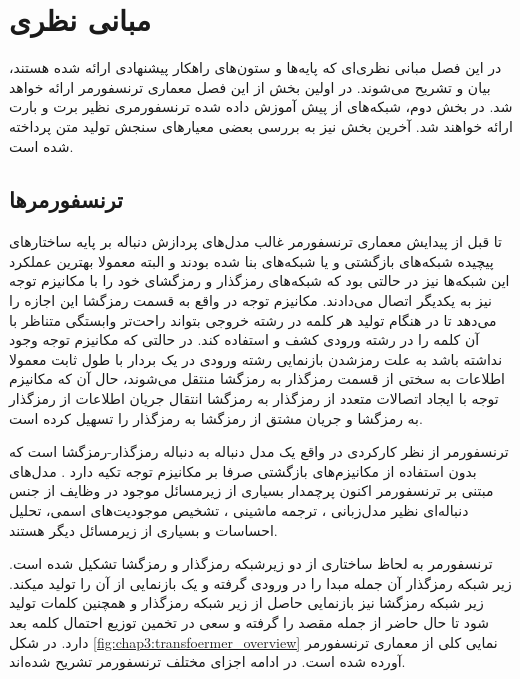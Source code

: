 \chapter{مبانی نظری}\label{chap3}
\minitoc

در این فصل مبانی نظری‌ای که پایه‌ها و ستون‌های راهکار پیشنهادی ارائه شده هستند، بیان و تشریح می‌شوند. در اولین بخش از این فصل معماری ترنسفورمر ارائه خواهد شد. در بخش دوم، شبکه‌های از پیش آموزش داده شده ترنسفورمری نظیر برت و بارت ارائه خواهند شد. آخرین بخش نیز به بررسی بعضی معیارهای سنجش تولید متن پرداخته شده است.

\section{ترنسفورمرها}

تا قبل از پیدایش معماری ترنسفورمر غالب مدل‌های پردازش دنباله بر پایه‌ ساختار‌های پیچیده شبکه‌های بازگشتی و یا شبکه‌های 
بنا شده بودند و البته معمولا بهترین عملکرد این شبکه‌ها نیز در حالتی بود که شبکه‌های رمزگذار و رمزگشای خود را با مکانیزم توجه نیز به یکدیگر اتصال می‌دادند. 
مکانیزم توجه در واقع به قسمت رمزگشا این اجازه را می‌دهد تا در هنگام تولید هر کلمه در رشته خروجی بتواند راحت‌تر وابستگی متناظر با آن کلمه را در رشته ورودی کشف و استفاده کند. در حالتی که مکانیزم توجه وجود نداشته باشد به علت رمزشدن بازنمایی رشته ورودی در یک بردار با طول ثابت معمولا اطلاعات به سختی از قسمت رمزگذار به رمزگشا منتقل می‌شوند، حال آن که مکانیزم توجه با ایجاد اتصالات متعدد از رمزگذار به رمزگشا انتقال جریان اطلاعات از رمزگذار به رمزگشا و جریان مشتق از رمزگشا به رمزگذار را تسهیل کرده است.

ترنسفورمر
از نظر کارکردی در واقع یک مدل دنباله به دنباله رمزگذار-رمزگشا است که بدون استفاده از مکانیزم‌های بازگشتی صرفا بر مکانیزم توجه تکیه دارد
\cite{transformer}
. مدل‌های مبتنی بر ترنسفورمر اکنون پرچمدار
بسیاری از زیرمسائل موجود در وظایف از جنس دنباله‌ای نظیر مدل‌زبانی
،
ترجمه ماشینی
، تشخیص موجودیت‌های اسمی، تحلیل احساسات
و بسیاری از زیرمسائل دیگر هستند.

ترنسفورمر به لحاظ ساختاری از دو زیرشبکه رمزگذار و رمزگشا تشکیل شده است.   
زیر شبکه رمزگذار آن جمله مبدا را در ورودی گرفته و یک بازنمایی از آن را تولید میکند. زیر شبکه رمزگشا نیز بازنمایی حاصل از زیر شبکه رمزگذار و همچنین کلمات تولید شود تا حال حاضر از جمله مقصد را گرفته و سعی در تخمین توزیع احتمال کلمه بعد دارد. در شکل 
\ref{fig:chap3:transfoermer_overview}
نمایی کلی از معماری ترنسفورمر آورده شده است. در ادامه اجزای مختلف ترنسفورمر تشریح شده‌اند.


